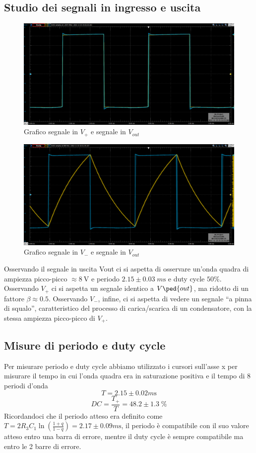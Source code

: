 \documentclass[10pt,a4paper]{article}
\begin{document}
\setcounter{subsection}{2}
\subsection{Studio dei segnali in ingresso e uscita}

\begin{figure}[htbp]
\centering
\includegraphics[scale=0.4]{V+Vout}
\caption{Grafico segnale in $V_+$ e segnale in $V_{out}$}
\end{figure}

\begin{figure}[htbp]
\centering
\includegraphics[scale=0.4]{V-Vout}
\caption{Grafico segnale in $V_-$ e segnale in $V_{out}$}
\end{figure}

Osservando il segnale in uscita Vout ci si aspetta di osservare un’onda quadra
di ampiezza picco-picco $\approx \SI{8}{\V}$ e periodo $2.15 \pm 0.03 \; \si{m\s}$ e
duty cycle $50 \%$.
Osservando $V_+$ ci si aspetta un segnale identico a $V\ped{out}$, ma ridotto di
un fattore $\beta \approx 0.5$.
Osservando $V_-$, infine, ci si aspetta di vedere un segnale ``a pinna di
squalo'', caratteristico del processo di carica/scarica di un condensatore,
con la stessa ampiezza picco-picco di $V_+$.

\subsection{Misure di periodo e duty cycle}
Per misurare periodo e duty cycle abbiamo utilizzato i cursori sull'asse x per misurare il tempo in cui l'onda quadra era in saturazione positiva e il tempo di 8 periodi d'onda
\[
T = 2.15 \pm 0.02 \si{m\s}
\]
\[
DC = \frac{T_+}{T}=48.2 \pm 1.3 \; \si{\%}
\]
Ricordandoci che il periodo atteso era definito come $T = 2 R_3 C_1 \ln\left(\frac{1 + q}{1 - q}\right) = 2.17 \pm 0.09 \si{m\s}$,
il periodo è compatibile con il suo valore atteso entro una barra di errore, mentre il duty cycle è sempre compatibile ma entro le 2 barre di errore.
\end{document}
